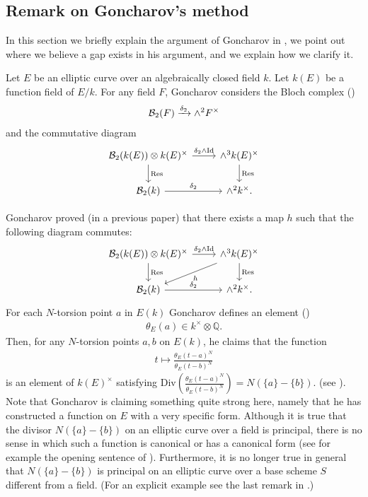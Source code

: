 \documentclass[12pt,amstex,amssymb]{article}
\theoremstyle{plain}
\theoremstyle{definition}
\def\cB{{\cal B}}
\def\Q{{\mathbb Q}}
\newcommand{\be}{\begin{eqnarray*}}
\newcommand{\ee}{\end{eqnarray*}}
\begin{document}
\subsection{Remark on Goncharov's method}\label{GonchMethod}
In this section we briefly explain the argument of Goncharov in \cite{Gon}, we point out where we believe a gap exists in his argument, and we explain how we clarify it.

Let $E$ be an elliptic curve over an algebraically closed field $k$.
Let $k(E)$ be a function field of $E/k$.
For any field $F$, Goncharov considers the Bloch complex (\cite[section 2.1]{Gon})
\be
\cB_2(F) \xrightarrow{\delta_2} \wedge^2 F^\times
\ee
and the commutative diagram
\[\begin{tikzcd}
	{\cB_2(k(E))\otimes k(E)^\times} & {\wedge^3 k(E)^\times} \\
	{\cB_2(k)} & {\wedge^2k^\times.}
	\arrow["{\delta_2\wedge \mathrm{Id}}", from=1-1, to=1-2]
	\arrow["{\mathrm{Res}}", from=1-1, to=2-1]
	\arrow["{\mathrm{Res}}", from=1-2, to=2-2]
	\arrow["{\delta_2}", from=2-1, to=2-2]
\end{tikzcd}\]

Goncharov \cite[Theorem 2.4]{Gon} proved (in a previous paper) that there exists a map $h$ such that the following diagram commutes:
\[\begin{tikzcd}
	{\cB_2(k(E))\otimes k(E)^\times} & {\wedge^3k(E)^\times} \\
	{\cB_2(k)} & {\wedge^2k^\times.}
	\arrow["{\delta_2\wedge \mathrm{Id}}", from=1-1, to=1-2]
	\arrow["{\mathrm{Res}}", from=1-1, to=2-1]
	\arrow["h", from=1-2, to=2-1]
	\arrow["{\mathrm{Res}}", from=1-2, to=2-2]
	\arrow["{\delta_2}", from=2-1, to=2-2]
\end{tikzcd}\]
For each $N$-torsion point $a$ in $E(k)$ Goncharov defines an element (\cite[Corollary 2.6]{Gon})
\be
\theta_E(a) \in k^\times \otimes \Q.
\ee
Then, for any $N$-torsion points $a,b$ on $E(k)$, he claims that the function
\be
t \mapsto \frac{\theta_E(t-a)^N}{\theta_E(t-b)^N}
\ee
is an element of $k(E)^\times$ satisfying $\mathrm{Div} (\frac{\theta_E(t-a)^N}{\theta_E(t-b)^N}) = N (\{a\} - \{b\})$.
(see \cite[section 2.4, page 1889-1890]{Gon}).  
Note that Goncharov is claiming something quite strong here, namely that he has constructed a function on $E$ with a very specific form.  Although it is true that the divisor $N (\{a\} - \{b\})$ on an elliptic curve over a field is principal, there is no sense in which such a function is canonical or has a canonical form (see for example the opening sentence of \cite[section 1.2]{Sch}).  Furthermore, it is no longer true in general that $N (\{a\} - \{b\})$ is principal on an elliptic curve over a base scheme $S$ different from a field. (For an explicit example see the last remark in \cite[section 1.2]{Sch}.)
\end{document}
